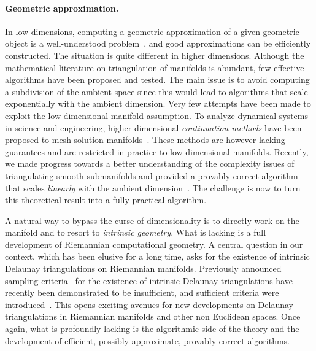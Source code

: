 \paragraph{Geometric approximation.}
In low dimensions, computing a geometric approximation of a given geometric
object is a well-understood problem~\cite{geometrica-ecg-book,dey-csr-2007}, and good approximations can be
efficiently constructed.
The situation is quite different in higher dimensions.  Although the
mathematical literature on triangulation of manifolds is abundant, few
effective algorithms have been proposed and tested.  The main issue is
to avoid computing a subdivision of the ambient space since this would lead to algorithms that scale exponentially with the ambient dimension. Very few attempts have been made to exploit the  low-dimensional manifold assumption.
To analyze {dynamical systems} in science and engineering, higher-dimensional {\em continuation methods} have been proposed to mesh solution manifolds~\cite{mh-mpc-2002}. These methods are however lacking guarantees and are restricted in practice to low dimensional manifolds. 
Recently, we made progress towards a better understanding of the complexity issues of triangulating smooth submanifolds and provided a provably correct algorithm that scales {\em linearly} with the ambient dimension~\cite{boissonnat2010meshing}. 
The challenge is now to turn this theoretical result into a fully practical algorithm.

A natural way to bypass the curse of dimensionality is to directly
work on the manifold and to resort to {\em intrinsic geometry}. What
is lacking is a full development of Riemannian computational
geometry. A central question in our context, which has been elusive
for a long time, asks for the existence of intrinsic Delaunay triangulations on
Riemannian manifolds. Previously announced sampling
criteria~\cite{leibon2000} for the existence of intrinsic Delaunay
triangulations have recently been demonstrated to be insufficient, and
sufficient criteria were introduced~\cite{boissonnat2012stab}. This opens exciting avenues for new developments on Delaunay triangulations in Riemannian manifolds and other non Euclidean spaces. Once again, what is profoundly lacking is the algorithmic side of the theory and the development of efficient, possibly approximate, provably correct algorithms.  %


